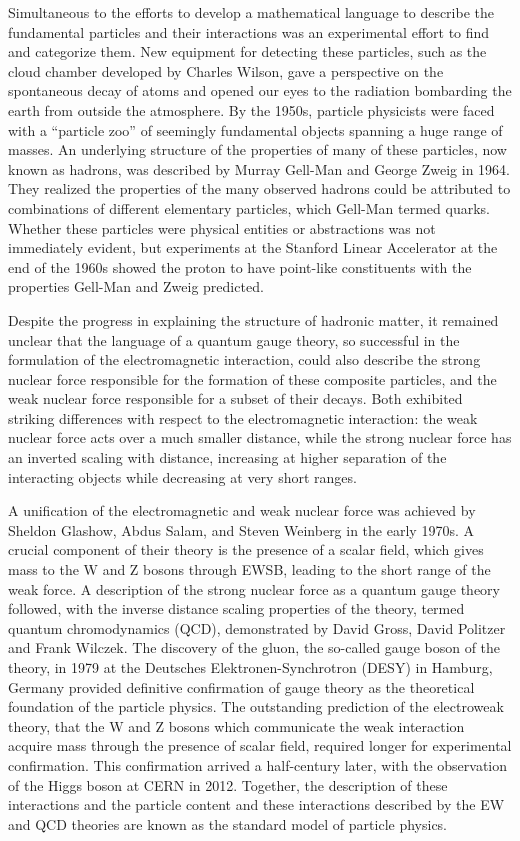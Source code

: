 Simultaneous to the efforts to develop a mathematical language to describe 
the fundamental particles and their interactions was an experimental effort 
to find and categorize them. New equipment for detecting these particles,
such as the cloud chamber developed by Charles Wilson, 
gave a perspective on the spontaneous 
decay of atoms and opened our eyes to the radiation bombarding the earth from
outside the atmosphere. By the 1950s, particle physicists were faced with a ``particle zoo''
of seemingly fundamental objects spanning a huge range of masses. 
An underlying structure of the properties of many of these particles, 
now known as hadrons, was described by Murray Gell-Man and George Zweig in 1964.
They realized the properties of the many observed hadrons could be 
attributed to combinations of different elementary particles,
which Gell-Man termed quarks.
Whether these particles were physical entities or abstractions was 
not immediately evident, but experiments at the Stanford Linear Accelerator
at the end of the 1960s showed the proton to have point-like constituents
with the properties Gell-Man and Zweig predicted.

Despite the progress in explaining the structure of hadronic matter,
it remained unclear that the language of a quantum gauge theory, 
so successful in the formulation of the electromagnetic interaction, could 
also describe the strong nuclear force responsible for the formation
of these composite particles, and the weak nuclear force responsible for
a subset of their decays. Both exhibited striking differences with
respect to the electromagnetic interaction:
the weak nuclear force acts over a much smaller distance, while
the strong nuclear 
force has an inverted scaling with distance, increasing at higher separation
of the interacting objects while decreasing at very short ranges. 

A unification of the electromagnetic and weak nuclear force was achieved
by Sheldon Glashow, Abdus Salam, and Steven Weinberg in the early 1970s.
A crucial component of their theory is the presence of a scalar field, 
which gives mass to the W and Z bosons through EWSB, leading to the 
short range of the weak force.
A description of the strong nuclear force as a quantum 
gauge theory followed,
with the inverse distance scaling properties of the theory,
termed quantum chromodynamics (QCD), demonstrated by
David Gross, David Politzer and Frank Wilczek.
The discovery of the gluon, the so-called gauge boson of the theory,
in 1979 at the Deutsches Elektronen-Synchrotron (DESY) in Hamburg, Germany
provided definitive confirmation
of gauge theory as the theoretical foundation of the particle physics.
The outstanding prediction of the 
electroweak theory, that the W and Z bosons which communicate the weak 
interaction acquire mass through the presence of scalar field, required
longer for experimental confirmation. This confirmation arrived a half-century
later, with the observation of the Higgs boson at CERN in 2012.
Together, the description of these interactions and the particle content
and these interactions described by the EW and QCD theories are known
as the standard model of particle physics.

